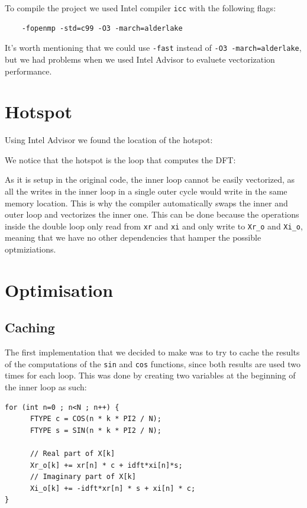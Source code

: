 \documentclass{article}
\begin{document}
To compile the project we used Intel compiler \texttt{icc} with the following flags: 
\begin{verbatim}
    -fopenmp -std=c99 -O3 -march=alderlake
\end{verbatim}
It's worth mentioning that we could use \verb|-fast| instead of \verb|-O3 -march=alderlake|, but we had problems when we used Intel Advisor to evaluete vectorization performance.

\section{Hotspot}
Using Intel Advisor we found the location of the hotspot:


We notice that the hotspot is the loop that computes the DFT:


As it is setup in the original code, the inner loop cannot be easily vectorized, as all the writes in the inner loop in a single outer cycle would write in the same memory location. This is why the compiler automatically swaps the inner and outer loop and vectorizes the inner one. This can be done because the operations inside the double loop only read from \verb|xr| and \verb|xi| and only write to \verb|Xr_o| and \verb|Xi_o|, meaning that we have no other dependencies that hamper the possible optmiziations.

\section{Optimisation}

\subsection{Caching}

The first implementation that we decided to make was to try to cache the results of the computations of the \verb|sin| and \verb|cos| functions, since both results are used two times for each loop. This was done by creating two variables at the beginning of the inner loop as such:
\begin{verbatim}
for (int n=0 ; n<N ; n++) {
      FTYPE c = COS(n * k * PI2 / N);
      FTYPE s = SIN(n * k * PI2 / N);

      // Real part of X[k]
      Xr_o[k] += xr[n] * c + idft*xi[n]*s;
      // Imaginary part of X[k]
      Xi_o[k] += -idft*xr[n] * s + xi[n] * c;
}
\end{verbatim}
\end{document}
